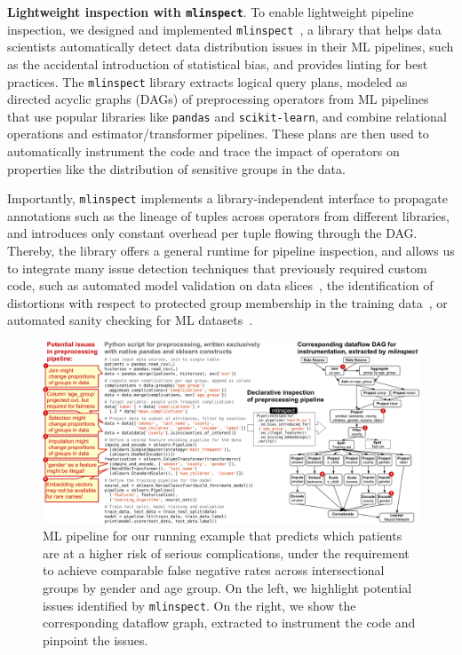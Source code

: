 \documentclass[11pt]{article}
\newcommand{\sklearn}{\stt{scikit-learn}\xspace}
\newcommand{\pandas}{\stt{pandas}\xspace}
\newcommand{\mlinspect}{\stt{mlinspect}\xspace}
\newcommand{\header}[1]{\vspace{1mm}\noindent\textbf{#1}.}
\newcommand{\stt}[1]{{\footnotesize\texttt{#1}}}
\begin{document}
\header{Lightweight inspection with \mlinspect} To enable lightweight pipeline inspection, we designed and implemented \mlinspect~\cite{grafberger2021mlinspect}, a library that helps data scientists automatically detect data distribution issues in their ML pipelines, such as the accidental introduction of statistical bias, and provides linting for best practices. The \mlinspect library extracts logical query plans, modeled as directed acyclic graphs (DAGs) of preprocessing operators from ML pipelines that use  popular libraries like \pandas and \sklearn, and combine relational operations and estimator/transformer pipelines. These plans are then used to automatically instrument the code and trace the impact of operators on properties like the distribution of sensitive groups in the data. 

Importantly, \mlinspect implements a library-independent interface to propagate annotations such as the lineage of tuples across operators from different libraries, and introduces only constant overhead per tuple flowing through the DAG. Thereby, the library offers a general runtime for pipeline inspection, and allows us to integrate many issue detection techniques that previously required custom code, such as automated model validation on data slices~\cite{SliceFinder}, the identification of distortions with respect to protected group membership in the training data~\cite{fairdags}, or automated sanity checking for ML datasets~\cite{hynes2017data}.

\begin{figure}[t!]
  \centering
  \includegraphics[width=\textwidth]{figs/example-crop}
  \caption{ML pipeline for our running example that predicts which patients are at a higher risk of serious complications, under the requirement to achieve comparable false negative rates across intersectional groups by gender and age group.  On the left, we highlight potential issues identified by \mlinspect. On the right, we show the corresponding dataflow graph, extracted to instrument the code and pinpoint the issues.}
  \label{fig:example}
\end{figure}
\end{document}

